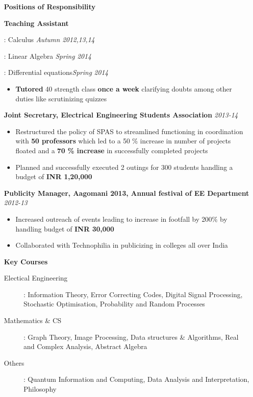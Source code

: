 \documentclass[a4paper,10pt]{article}
\newcommand{\resheading}[1]{
	{\large \colorbox{mygrey}{\begin{minipage}{\textwidth}{\textbf{#1 \vphantom{p\^{E}}}}\end{minipage}}}
}
\newcommand{\ressubheadingother}[2]{
	\textbf{#1} \hfill \textit{#2}\null
	\vspace{-4pt}
}
\begin{document}

\resheading{Positions of Responsibility}

			\ressubheadingother{Teaching Assistant}{}

			\begin{description} [labelindent=*] \itemsep -1pt
					\item[MA 105]: Calculus \hfill \textit{Autumn 2012,13,14}
					\item[MA 106]: Linear Algebra \hfill \textit{Spring 2014}
					\item[MA 108]: Differential equations\hfill \textit{Spring 2014}
				\end{description}
			\vspace{-15pt}
			\begin{itemize}
			\item \textbf{Tutored} 40 strength class \textbf{once a week} clarifying doubts among other duties like scrutinizing quizzes
			\end{itemize}


			\ressubheadingother{Joint Secretary, Electrical Engineering Students Association}{2013-14}
			\begin{itemize} \itemsep -1pt
				\item Restructured the policy of SPAS to streamlined functioning in coordination with \textbf{50 professors} which led to a 50 \% increase in number of projects floated and a \textbf{70 \% increase} in successfully completed projects
				\item Planned and successfully executed 2 outings for 300 students handling a budget of \textbf{INR 1,20,000}
			\end{itemize}

			\ressubheadingother{Publicity Manager, Aagomani 2013, Annual festival of EE Department}{2012-13}
			\begin{itemize}\itemsep -1pt
				\item Increased outreach of events leading to increase in footfall by 200\% by handling budget of \textbf{INR 30,000}  
				\item Collaborated with Technophilia in publicizing in colleges all over India
			\end{itemize}
	
\resheading{Key Courses}
\begin{description}
\item[Electical Engineering]:  Information Theory, Error Correcting Codes, Digital Signal Processing, Stochastic Optimisation, Probability and Random Processes
\item[Mathematics \& CS]: Graph Theory, Image Processing, Data structures \& Algorithms, Real and Complex Analysis, Abstract Algebra
\item[Others]: Quantum Information and Computing, Data Analysis and Interpretation, Philosophy
\end{description}
\end{document}
